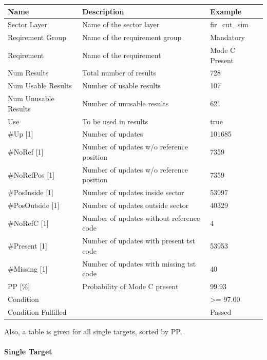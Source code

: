 \begin{center}
 \begin{table}[H]
  \begin{tabularx}{\textwidth}{ | l | X |  l | }
    \hline
    \textbf{Name} & \textbf{Description} & \textbf{Example} \\ \hline
    Sector Layer & Name of the sector layer & fir\_cut\_sim \\ \hline
    Reqirement Group & Name of the requirement group & Mandatory \\ \hline
    Reqirement & Name of the requirement & Mode C Present \\ \hline
    Num Results & Total number of results & 728 \\ \hline
    Num Usable Results & Number of usable results & 107 \\ \hline
    Num Unusable Results & Number of unusable results & 621 \\ \hline
    Use & To be used in results & true \\ \hline
    \#Up [1] & Number of updates & 101685 \\ \hline
    \#NoRef [1] & Number of updates w/o reference position & 7359 \\ \hline
    \#NoRefPos [1] & Number of updates w/o reference position  & 7359 \\ \hline
    \#PosInside [1] & Number of updates inside sector & 53997 \\ \hline
    \#PosOutside [1] & Number of updates outside sector & 40329 \\ \hline
    \#NoRefC [1] & Number of updates without reference code & 4 \\ \hline
    \#Present [1] & Number of updates with present tst code & 53953 \\ \hline
    \#Missing [1] & Number of updates with missing tst code & 40 \\ \hline
    PP [\%] & Probability of Mode C present & 99.93 \\ \hline
    Condition &  & >= 97.00 \\ \hline
    Condition Fulfilled &  & Passed \\ \hline
\end{tabularx}
\end{table}
\end{center}

Also, a table is given for all single targets, sorted by PP.

\paragraph{Single Target}

